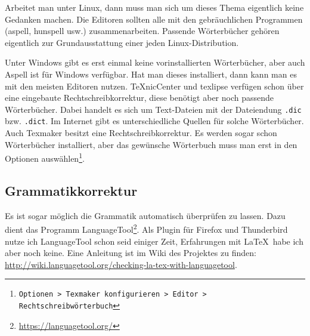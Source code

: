 Arbeitet man unter Linux, dann muss man sich um dieses Thema eigentlich keine Gedanken machen. Die Editoren sollten alle mit den gebräuchlichen Programmen (aspell, hunspell usw.) zusammenarbeiten. Passende Wörterbücher gehören eigentlich zur Grundausstattung einer jeden Linux-Distribution.

Unter Windows gibt es erst einmal keine vorinstallierten Wörterbücher, aber auch Aspell ist für Windows verfügbar. Hat man dieses installiert, dann kann man es mit den meisten Editoren nutzen. TeXnicCenter und texlipse verfügen schon über eine eingebaute Rechtschreibkorrektur, diese benötigt aber noch passende Wörterbücher. Dabei handelt es sich um Text-Dateien mit der Dateiendung \verb+.dic+ bzw. \verb+.dict+. Im Internet gibt es unterschiedliche Quellen für solche Wörterbücher. Auch Texmaker besitzt eine Rechtschreibkorrektur. Es werden sogar schon Wörterbücher installiert, aber das gewünsche Wörterbuch muss man erst in den Optionen auswählen\footnote{\texttt{Optionen > Texmaker konfigurieren > Editor > Rechtschreibwörterbuch}}.

\subsection{Grammatikkorrektur}

Es ist sogar möglich die Grammatik automatisch überprüfen zu lassen. Dazu dient das Programm LanguageTool\footnote{\url{https://languagetool.org/}}. Als Plugin für Firefox und Thunderbird nutze ich LanguageTool schon seid einiger Zeit, Erfahrungen mit \LaTeX\ habe ich aber noch keine. Eine Anleitung ist im Wiki des Projektes zu finden: \url{http://wiki.languagetool.org/checking-la-tex-with-languagetool}.